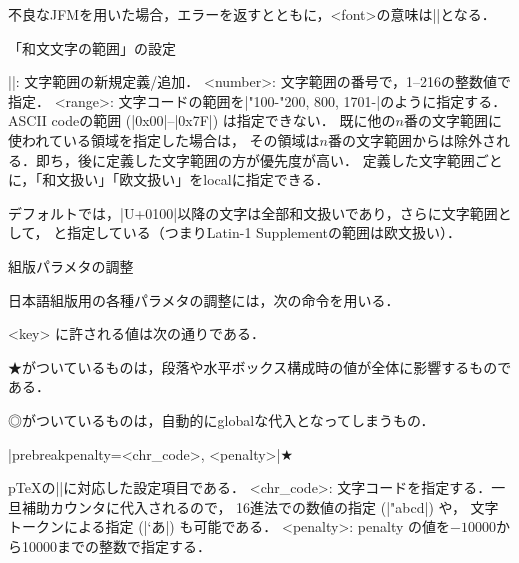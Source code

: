 \item 不良なJFMを用いた場合，エラーを返すとともに，<font>の意味は|\relax|となる．

\beginparagraph 「和文文字の範囲」の設定

\item ||: 文字範囲の新規定義/追加．
\itemitem <number>:  文字範囲の番号で，1--216の整数値で指定．
\itemitem <range>: 文字コードの範囲を|"100-"200, 800, 1701-|のように指定する．
\itemT ASCII codeの範囲 (|0x00|--|0x7F|) は指定できない．
\itemT 既に他の$n$番の文字範囲に使われている領域を指定した場合は，
その領域は$n$番の文字範囲からは除外される．即ち，後に定義した文字範囲の方が優先度が高い．
\itemitem 定義した文字範囲ごとに，「和文扱い」「欧文扱い」をlocalに指定できる．

\item デフォルトでは，|U+0100|以降の文字は全部和文扱いであり，さらに文字範囲として，
\begintt
\endtt
と指定している{\small（つまりLatin-1 Supplementの範囲は欧文扱い）\inhibitglue}．

\enditem


\beginparagraph 組版パラメタの調整

日本語組版用の各種パラメタの調整には，次の命令を用いる．
\begintt
\endtt

<key> に許される値は次の通りである．

\enum ★がついているものは，段落や水平ボックス構成時の値が全体に影響するものである．

\enum ◎がついているものは，自動的にglobalな代入となってしまうもの．

\item |prebreakpenalty={<chr_code>, <penalty>}|★\par\noindent
p\TeX の|\prebreakpenalty|に対応した設定項目である．
\itemitem <chr_code>: 文字コードを指定する．一旦補助カウンタに代入されるので，
16進法での数値の指定 (|"abcd|) や，%
文字トークンによる指定 (|`あ|) も可能である．
\itemitem <penalty>: penalty の値を$-10000$から10000までの整数で指定する．

